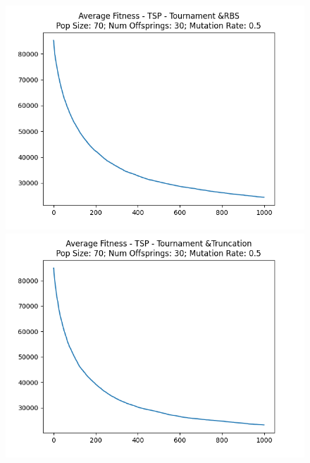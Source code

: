\documentclass[12pt]{report}
\theoremstyle{mytheoremstyle}
\theoremstyle{mytheoremstyle}
\theoremstyle{myproblemstyle}
\begin{document}
\begin{figure}[!]
\begin{minipage}{0.4\textwidth}
		\includegraphics[width=\linewidth]{../Analysis/ASF_TSP_2_1_70_30.png}
	\end{minipage}
	\hspace{\fill}
	\begin{minipage}{0.4\textwidth}
		\includegraphics[width=\linewidth]{../Analysis/ASF_TSP_2_3_70_30.png}
	\end{minipage}
	\vspace*{1cm}
	\begin{minipage}{0.4\textwidth}

\end{minipage}
\end{figure}
\end{document}
